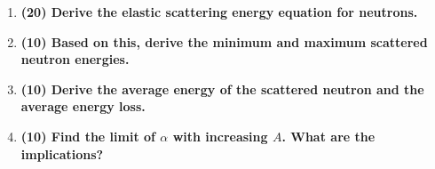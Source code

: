 \documentclass[11pt,a4paper]{article}
\begin{document}
\begin{enumerate}[leftmargin=*,topsep=0pt,font=\bfseries]
    \item\textbf{(20) Derive the elastic scattering energy equation for neutrons.}
        \vspace{0.25in}\\
    
        
        
        
        
        
        
        
        
        
        
        
        
        
        \newpage
    \item\textbf{(10) Based on this, derive the minimum and maximum scattered neutron energies.}
        \vspace{0.25in}\\
        
        
        
        
        
        
        
        
        
        
        
        
        
        
        \newpage
    \item\textbf{(10) Derive the average energy of the scattered neutron and the average energy loss.}
        \vspace{0.25in}\\

        
        
        
        
        
        
        
        
        
        
        
        
        
        \newpage
    \item\textbf{(10) Find the limit of $\alpha$ with increasing $A$. What are the implications?}
        \vspace{0.25in}\\

        
        
        
        
        
        
        
        
        
        

\end{enumerate}
\end{document}

